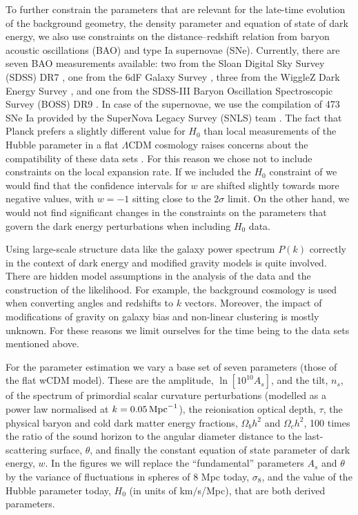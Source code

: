 To further constrain the parameters that are relevant for the late-time evolution of the background geometry, the density parameter and equation of state of dark energy, we also use constraints on the distance--redshift relation from baryon acoustic oscillations (BAO) and type Ia supernovae (SNe). Currently, there are seven BAO measurements available: two from the Sloan Digital Sky Survey (SDSS) DR7 
\cite{Percival:2009xn,Padmanabhan:2012hf}, one from the 6dF Galaxy Survey 
\cite{Beutler:2011hx}, three from the WiggleZ Dark Energy Survey 
\cite{Blake:2011en}, and one from the SDSS-III Baryon Oscillation Spectroscopic Survey (BOSS) DR9 
\cite{Anderson:2012sa}. In case of the supernovae, we use the compilation of 473 SNe Ia provided by the SuperNova Legacy Survey (SNLS) team \cite{Conley:2011ku}.
The fact that Planck prefers a slightly different value for $H_0$ than local measurements of the Hubble parameter in a flat $\Lambda$CDM cosmology raises concerns about the compatibility of these data sets \cite{Ade:2013zuv}. For this reason we chose not to include constraints on the local expansion rate. If we included
the $H_0$ constraint of \cite{Riess:2011yx} we would find that the confidence intervals for $w$ are shifted slightly towards more
negative values, with $w = -1$ sitting close to the $2 \sigma$
limit. On the other hand, we would not find significant changes in the
constraints on the parameters that govern the dark energy
perturbations when including $H_0$ data.

Using large-scale structure data like the galaxy power spectrum $P(k)$ correctly in the context
of dark energy and modified gravity models is quite involved. There are hidden model assumptions
in the analysis of the data and the construction of the likelihood. For example, the background cosmology
is used when
converting angles and redshifts to $k$ vectors. Moreover, the impact of modifications of  
gravity on galaxy bias and non-linear clustering is mostly unknown. For these reasons we limit ourselves for the time
being to the data sets mentioned above.

For the parameter estimation we vary a base set of seven parameters (those of the flat wCDM model). These are the amplitude, $\ln[10^{10}A_s]$, and the tilt, $n_s$, of the spectrum of primordial scalar curvature perturbations (modelled as a power law normalised at $k=0.05\,{\rm Mpc}^{-1}$), the reionisation optical depth, $\tau$, the physical baryon and cold dark matter energy fractions, $\Omega_b h^2$ and $\Omega_c h^2$, 100 times the ratio of the sound horizon to the angular diameter distance to the last-scattering surface, $\theta$, and finally the constant equation of state parameter of dark energy, $w$. In the figures we will replace the ``fundamental'' parameters $A_s$ and $\theta$ by the variance of fluctuations in spheres of 8 Mpc today, $\sigma_8$, and the value of the Hubble parameter today, $H_0$ (in units of km$/$s/Mpc), that are both derived parameters.


